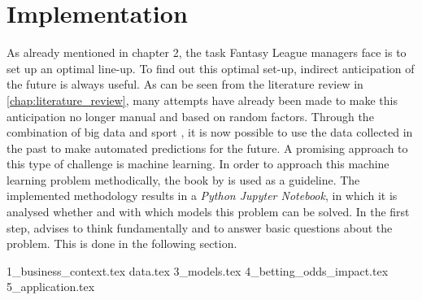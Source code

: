 \chapter{Implementation}

As already mentioned in chapter 2, the task Fantasy League managers face is to set up an optimal line-up. To find out this optimal set-up, indirect anticipation of the future is always useful. As can be seen from the literature review in \autoref{chap:literature_review}, many attempts have already been made to make this anticipation no longer manual and based on random factors. Through the combination of big data and sport \parencite[cf.][]{rein_big_2016}, it is now possible to use the data collected in the past to make automated predictions for the future. A promising approach to this type of challenge is machine learning. In order to approach this machine learning problem methodically, the book  by \citeauthor{geron_hands-machine_2019} is used as a guideline. The implemented methodology results in a \emph{Python Jupyter Notebook}, in which it is analysed whether and with which models this problem can be solved. In the first step, \citeauthor{geron_hands-machine_2019} advises to think fundamentally and to answer basic questions about the problem. This is done in the following section.

{1_business_context.tex}
{data.tex}
{3_models.tex}
{4_betting_odds_impact.tex}
{5_application.tex}



